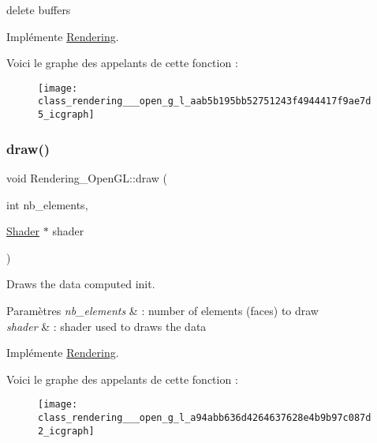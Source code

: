 delete buffers 



Implémente \hyperlink{class_rendering_a43cc4c8b7b4d9813773b42c97a7405d5}{Rendering}.

Voici le graphe des appelants de cette fonction \+:\nopagebreak
\begin{figure}[H]
\begin{center}
\leavevmode
\texttt{[image: class\_rendering\_\_\_open\_g\_l\_aab5b195bb52751243f4944417f9ae7d5\_icgraph]}
\end{center}
\end{figure}
\mbox{\label{class_rendering___open_g_l_a94abb636d4264637628e4b9b97c087d2}} 
\subsubsection{\texorpdfstring{draw()}{draw()}}
{\footnotesize\ttfamily void Rendering\+\_\+\+Open\+G\+L\+::draw (\begin{DoxyParamCaption}\item[{int}]{nb\+\_\+elements,  }\item[{\hyperlink{class_shader}{Shader} $\ast$}]{shader }\end{DoxyParamCaption})\hspace{0.3cm}{\ttfamily [virtual]}}



Draws the data computed init. 


\begin{DoxyParams}{Paramètres}
{\em nb\+\_\+elements} & \+: number of elements (faces) to draw \\
\hline
{\em shader} & \+: shader used to draws the data \\
\hline
\end{DoxyParams}


Implémente \hyperlink{class_rendering_abeffb3c261cd9b5c6b885aaf8e321ef2}{Rendering}.

Voici le graphe des appelants de cette fonction \+:\nopagebreak
\begin{figure}[H]
\begin{center}
\leavevmode
\texttt{[image: class\_rendering\_\_\_open\_g\_l\_a94abb636d4264637628e4b9b97c087d2\_icgraph]}
\end{center}
\end{figure}
\mbox{\label{class_rendering___open_g_l_a2df315de627ccedc056c5834e65bda6d}} 

